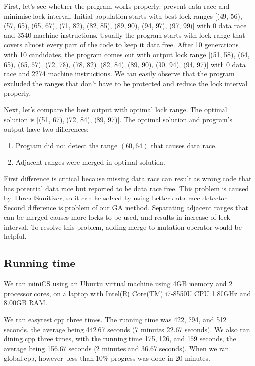 First, let's see whether the program works properly: prevent data race and minimise lock interval. Initial population starts with best lock ranges [(49, 56), (57, 65), (65, 67), (71, 82), (82, 85), (89, 90), (94, 97), (97, 99)] with 0 data race and 3540 machine instructions. Usually the program starts with lock range that covers almost every part of the code to keep it data free. After 10 generations with 10 candidates, the program comes out with output lock range [(51, 58), (64, 65), (65, 67), (72, 78), (78, 82), (82, 84), (89, 90), (90, 94), (94, 97)] with 0 data race and 2274 machine instructions. We can easily observe that the program excluded the ranges that don't have to be protected and reduce the lock interval properly. 

Next, let's compare the best output with optimal lock range. The optimal solution is [(51, 67), (72, 84), (89, 97)]. The optimal solution and program's output have two differences:

\begin{enumerate}
    \item Program did not detect the range $(60, 64)$ that causes data race.
    \item Adjacent ranges were merged in optimal solution.
\end{enumerate}

First difference is critical because missing data race can result as wrong code that has potential data race but reported to be data race free. This problem is caused by ThreadSanitizer, so it can be solved by using better data race detector. Second difference is problem of our GA method. Separating adjacent ranges that can be merged causes more locks to be used, and results in increase of lock interval. To resolve this problem, adding merge to mutation operator would be helpful.

\subsection{Running time}

We ran miniCS using an Ubuntu virtual machine using 4GB memory and 2 processor cores, on a laptop with Intel(R) Core(TM) i7-8550U CPU 1.80GHz and 8.00GB RAM.

We ran easytest.cpp three times. The running time was 422, 394, and 512 seconds, the average being 442.67 seconds (7 minutes 22.67 seconds). We also ran dining.cpp three times, with the running time 175, 126, and 169 seconds, the average being 156.67 seconds (2 minutes and 36.67 seconds). When we ran global.cpp, however, less than 10\% progress was done in 20 minutes.
